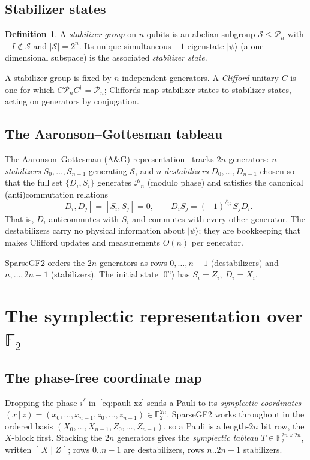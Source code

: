 \documentclass[11pt]{article}
\theoremstyle{definition}
\newtheorem{definition}{Definition}[section]
\theoremstyle{plain}
\newcommand{\F}{\mathbb{F}}
\newcommand{\xz}{(x\,|\,z)}
\newcommand{\code}{\textsf{\small SparseGF2}}
\newcommand{\ket}[1]{\lvert #1\rangle}
\begin{document}
\subsection{Stabilizer states}
\begin{definition}
A \emph{stabilizer group} on $n$ qubits is an abelian subgroup
$\mathcal{S}\le\mathcal{P}_n$ with $-I\notin\mathcal{S}$ and $|\mathcal{S}|=2^n$.
Its unique simultaneous $+1$ eigenstate $\ket{\psi}$ (a one-dimensional
subspace) is the associated \emph{stabilizer state}.
\end{definition}
A stabilizer group is fixed by $n$ independent generators. A \emph{Clifford}
unitary $C$ is one for which $C\mathcal{P}_nC^\dagger=\mathcal{P}_n$; Cliffords
map stabilizer states to stabilizer states, acting on generators by conjugation.

\subsection{The Aaronson--Gottesman tableau}
\label{sec:ag}
The Aaronson--Gottesman (A\&G) representation~\cite{AG} tracks $2n$ generators:
$n$ \emph{stabilizers} $S_0,\dots,S_{n-1}$ generating $\mathcal{S}$, and $n$
\emph{destabilizers} $D_0,\dots,D_{n-1}$ chosen so that the full set
$\{D_i,S_i\}$ generates $\mathcal{P}_n$ (modulo phase) and satisfies the
canonical (anti)commutation relations
\begin{equation}
\label{eq:canonical}
  [D_i,D_j]=[S_i,S_j]=0,\qquad
  D_i S_j = (-1)^{\delta_{ij}}\, S_j D_i .
\end{equation}
That is, $D_i$ anticommutes with $S_i$ and commutes with every other generator.
The destabilizers carry no physical information about $\ket\psi$; they are
bookkeeping that makes Clifford updates and measurements $O(n)$ per generator.

\code{} orders the $2n$ generators as rows $0,\dots,n-1$ (destabilizers) and
$n,\dots,2n-1$ (stabilizers). The initial state $\ket{0^n}$ has
$S_i=Z_i,\ D_i=X_i$.

\section{The symplectic representation over \texorpdfstring{$\F_2$}{F2}}
\label{sec:symp}

\subsection{The phase-free coordinate map}
Dropping the phase $i^\delta$ in~\eqref{eq:pauli-xz} sends a Pauli to its
\emph{symplectic coordinates}
$\xz=(x_0,\dots,x_{n-1},z_0,\dots,z_{n-1})\in\F_2^{2n}$. \code{} works
throughout in the ordered basis
$(X_0,\dots,X_{n-1},Z_0,\dots,Z_{n-1})$, so a Pauli is a length-$2n$ bit row,
the $X$-block first. Stacking the $2n$ generators gives the
\emph{symplectic tableau} $T\in\F_2^{2n\times 2n}$, written $[\,X\mid Z\,]$;
rows $0..n{-}1$ are destabilizers, rows $n..2n{-}1$ stabilizers.
\end{document}

